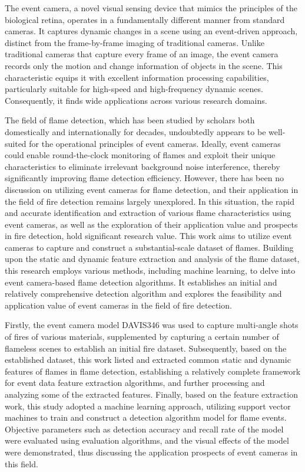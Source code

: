 \begin{abstract*}
  The event camera, a novel visual sensing device that mimics the principles of the biological
  retina, operates in a fundamentally different manner from standard cameras. It captures dynamic 
  changes in a scene using an event-driven approach, distinct from the frame-by-frame imaging of 
  traditional cameras. Unlike traditional cameras that capture every frame of an image, the event 
  camera records only the motion and change information of objects in the scene. This characteristic
  equips it with excellent information processing capabilities, particularly suitable for high-speed 
  and high-frequency dynamic scenes. Consequently, it finds wide applications across various research domains.
 
  The field of flame detection, which has been studied by scholars both domestically and internationally 
  for decades, undoubtedly appears to be well-suited for the operational principles of event cameras. 
  Ideally, event cameras could enable round-the-clock monitoring of flames and exploit their unique 
  characteristics to eliminate irrelevant background noise interference, thereby significantly improving flame 
  detection efficiency.  However, there has been no discussion on utilizing event cameras for flame detection, 
  and their application in the field of fire detection remains largely unexplored. In this situation, the rapid 
  and accurate identification and extraction of various flame characteristics using event cameras, as well as 
  the exploration of their application value and prospects in fire detection, hold significant research value.
  This work aims to utilize event cameras to capture and construct a substantial-scale dataset of flames. 
  Building upon the static and dynamic feature extraction and analysis of the flame dataset, this research 
  employs various methods, including machine learning, to delve into event camera-based flame detection algorithms.
  It establishes an initial and relatively comprehensive detection algorithm and explores the feasibility 
  and application value of event cameras in the field of fire detection.
 
  Firstly, the event camera model DAVIS346 was used to capture multi-angle shots of fires of various materials, 
  supplemented by capturing a certain number of flameless scenes to establish an initial fire dataset. Subsequently, 
  based on the established dataset, this work listed and extracted common static and dynamic features of flames in 
  flame detection, establishing a relatively complete framework for event data feature extraction algorithms, and 
  further processing and analyzing some of the extracted features. Finally, based on the feature extraction work, 
  this study adopted a machine learning approach, utilizing support vector machines to train and construct a detection 
  algorithm model for flame events. Objective parameters such as detection accuracy and recall rate of the model were 
  evaluated using evaluation algorithms, and the visual effects of the model were demonstrated, thus discussing the 
  application prospects of event cameras in this field.


\end{abstract*}
